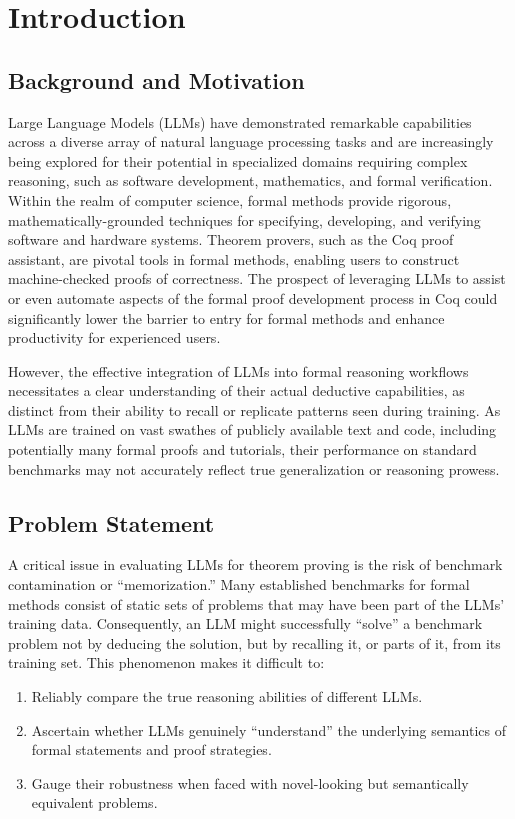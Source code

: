 \section{Introduction}
\label{sec:introduction}

\subsection{Background and Motivation}
\label{sec:intro_background}

Large Language Models (LLMs) have demonstrated remarkable capabilities across a diverse array of natural language processing tasks and are increasingly being explored for their potential in specialized domains requiring complex reasoning, such as software development, mathematics, and formal verification. Within the realm of computer science, formal methods provide rigorous, mathematically-grounded techniques for specifying, developing, and verifying software and hardware systems. Theorem provers, such as the Coq proof assistant, are pivotal tools in formal methods, enabling users to construct machine-checked proofs of correctness. The prospect of leveraging LLMs to assist or even automate aspects of the formal proof development process in Coq could significantly lower the barrier to entry for formal methods and enhance productivity for experienced users.

However, the effective integration of LLMs into formal reasoning workflows necessitates a clear understanding of their actual deductive capabilities, as distinct from their ability to recall or replicate patterns seen during training. As LLMs are trained on vast swathes of publicly available text and code, including potentially many formal proofs and tutorials, their performance on standard benchmarks may not accurately reflect true generalization or reasoning prowess.

\subsection{Problem Statement}
\label{sec:intro_problem}

A critical issue in evaluating LLMs for theorem proving is the risk of benchmark contamination or ``memorization.'' Many established benchmarks for formal methods consist of static sets of problems that may have been part of the LLMs' training data. Consequently, an LLM might successfully ``solve'' a benchmark problem not by deducing the solution, but by recalling it, or parts of it, from its training set. This phenomenon makes it difficult to:
\begin{enumerate}
    \item Reliably compare the true reasoning abilities of different LLMs.
    \item Ascertain whether LLMs genuinely ``understand'' the underlying semantics of formal statements and proof strategies.
    \item Gauge their robustness when faced with novel-looking but semantically equivalent problems.
\end{enumerate}

